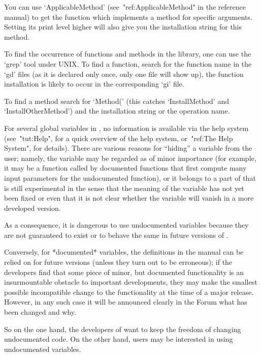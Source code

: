 You can use `ApplicableMethod' (see~"ref:ApplicableMethod" in the reference
manual) to get the function which implements a method for specific
arguments. Setting its print level higher will also give you the
installation string for this method.

To find the occurrence of functions and methods in the library, one can use
the `grep' tool under UNIX. To find a function, search for the function name
in the `gd' files (as it is declared only once, only one file will show up),
the function installation is likely to occur in the corresponding `gi' file.

To find a method search for `Method(' (this catches `InstallMethod' and
`InstallOtherMethod') and the installation string or the operation name.



For several global variables in {\GAP},
no information is available via the help system 
(see~"tut:Help", for a quick overview of the help system,
or~"ref:The Help System", for details).
There are various reasons for ``hiding'' a variable from the user;
namely, the variable may be regarded as of minor importance
(for example, it may be a function called by documented {\GAP}
functions that first compute many input parameters for the undocumented
function),
or it belongs to a part of {\GAP} that is still experimental in the sense
that the meaning of the variable has not yet been fixed or even that it is
not clear whether the variable will vanish in a more developed version.

As a consequence, it is dangerous to use undocumented variables because
they are not guaranteed to exist or to behave the same in future versions
of {\GAP}.

Conversely, for *documented* variables, the definitions in the {\GAP}
manual can be relied on for future {\GAP} versions (unless they turn out
to be erroneous);
if the {\GAP} developers find that some piece of minor, but documented
functionality is an insurmountable obstacle to important developments,
they may make the smallest possible incompatible change to the functionality
at the time of a major release.
However, in any such case it will be announced clearly in the {\GAP} Forum
what has been changed and why.

So on the one hand, the developers of {\GAP} want to keep the freedom
of changing undocumented {\GAP} code.
On the other hand, users may be interested in using undocumented
variables.

